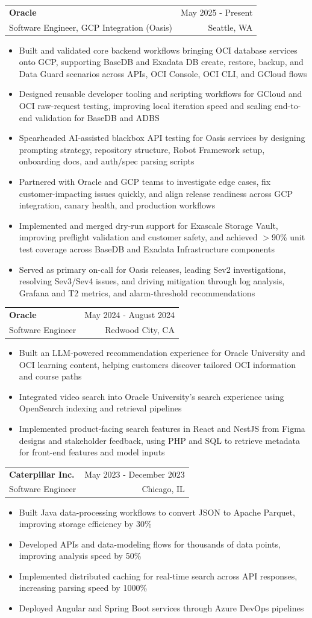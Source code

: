 \documentclass[letterpaper,11pt]{article}
\makeatletter
\newcommand{\resumeItem}[1]{
  \item\small{
    {#1 \vspace{-2pt}}
  }
}
\newcommand{\resumeSubheading}[4]{
  \vspace{-2pt}\item
    \begin{tabular*}{0.97\textwidth}[t]{l@{\extracolsep{\fill}}r}
      \textbf{#1} & #2 \\
      {\small#3} & {\small #4} \\
    \end{tabular*}\vspace{-7pt}
}
\newcommand{\resumeItemListStart}{\begin{itemize}}
\newcommand{\resumeItemListEnd}{\end{itemize}\vspace{-5pt}}
\makeatother
\begin{document}
    \resumeSubheading
  {Oracle}{May 2025 - Present}
  {Software Engineer, GCP Integration (Oasis)}{Seattle, WA}
  \resumeItemListStart
    \resumeItem{Built and validated core backend workflows bringing OCI database services onto GCP, supporting BaseDB and Exadata DB create, restore, backup, and Data Guard scenarios across APIs, OCI Console, OCI CLI, and GCloud flows}
    \resumeItem{Designed reusable developer tooling and scripting workflows for GCloud and OCI raw-request testing, improving local iteration speed and scaling end-to-end validation for BaseDB and ADBS}
    \resumeItem{Spearheaded AI-assisted blackbox API testing for Oasis services by designing prompting strategy, repository structure, Robot Framework setup, onboarding docs, and auth/spec parsing scripts}
    \resumeItem{Partnered with Oracle and GCP teams to investigate edge cases, fix customer-impacting issues quickly, and align release readiness across GCP integration, canary health, and production workflows}
    \resumeItem{Implemented and merged dry-run support for Exascale Storage Vault, improving preflight validation and customer safety, and achieved $>$90\% unit test coverage across BaseDB and Exadata Infrastructure components}
    \resumeItem{Served as primary on-call for Oasis releases, leading Sev2 investigations, resolving Sev3/Sev4 issues, and driving mitigation through log analysis, Grafana and T2 metrics, and alarm-threshold recommendations}
  \resumeItemListEnd

    \resumeSubheading
      {Oracle}{May 2024 - August 2024}
      {Software Engineer}{Redwood City, CA}
      \resumeItemListStart
        \resumeItem{Built an LLM-powered recommendation experience for Oracle University and OCI learning content, helping customers discover tailored OCI information and course paths}
        \resumeItem{Integrated video search into Oracle University's search experience using OpenSearch indexing and retrieval pipelines}
        \resumeItem{Implemented product-facing search features in React and NestJS from Figma designs and stakeholder feedback, using PHP and SQL to retrieve metadata for front-end features and model inputs}
      \resumeItemListEnd

    \resumeSubheading
      {Caterpillar Inc.}{May 2023 - December 2023}
      {Software Engineer}{Chicago, IL}
      \resumeItemListStart
        \resumeItem{Built Java data-processing workflows to convert JSON to Apache Parquet, improving storage efficiency by 30\%}
        \resumeItem{Developed APIs and data-modeling flows for thousands of data points, improving analysis speed by 50\%}
        \resumeItem{Implemented distributed caching for real-time search across API responses, increasing parsing speed by 1000\%}
        \resumeItem{Deployed Angular and Spring Boot services through Azure DevOps pipelines}
      \resumeItemListEnd
\end{document}
